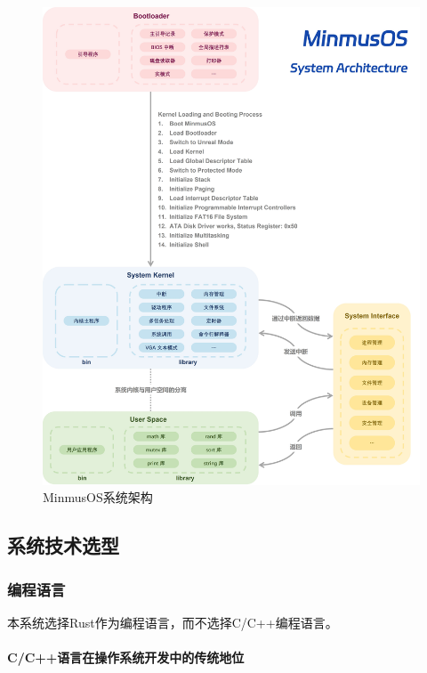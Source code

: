 \begin{figure}[htbp]
    \centering
    \includegraphics[width=\textwidth]{figures/SystemArchitecture.jpg}
    \caption{MinmusOS系统架构}
    \label{fig:SystemArchitecture}
\end{figure}

\subsection{系统技术选型}\label{sec:SystemTechnicalSelection}

\subsubsection{编程语言}

本系统选择Rust作为编程语言，而不选择C/C++编程语言。

\paragraph{C/C++语言在操作系统开发中的传统地位}

